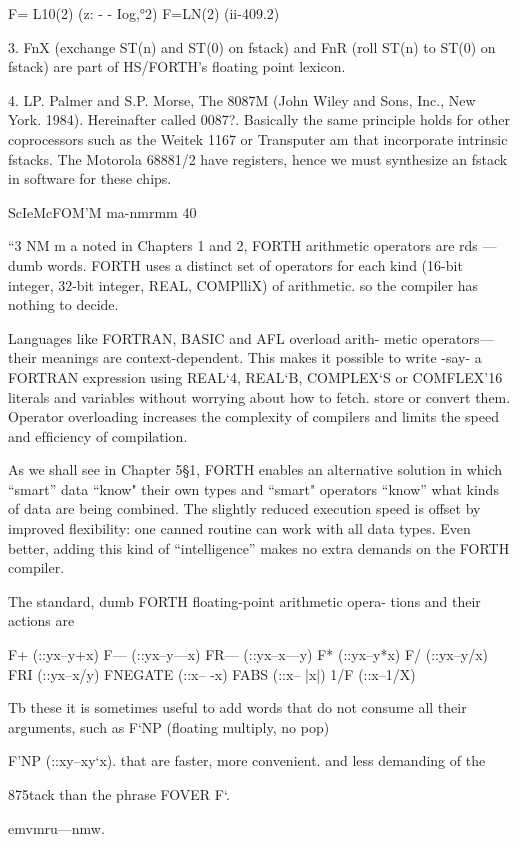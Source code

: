 F= L10(2) (z: - - Iog,°2)
F=LN(2) (ii-409.2)

 

3. FnX (exchange ST(n) and ST(0) on fstack) and FnR (roll ST(n) to ST(0) on fstack) are part of
HS/FORTH’s floating point lexicon.

4. LP. Palmer and S.P. Morse, The 8087M (John Wiley and Sons, Inc., New York. 1984).
Hereinafter called 0087?. Basically the same principle holds for other coprocessors such as
the Weitek 1167 or Transputer am that incorporate intrinsic fstacks. The Motorola 68881/2 have
registers, hence we must synthesize an fstack in software for these chips.

ScIeMcFOM'M ma-nmrmm 40

“3 NM m
a noted in Chapters 1 and 2, FORTH arithmetic operators are
rds —dumb words. FORTH uses a distinct set of operators
for each kind (16-bit integer, 32-bit integer, REAL, COMPlliX)
of arithmetic. so the compiler has nothing to decide.

Languages like FORTRAN, BASIC and AFL overload arith-
metic operators—their meanings are context-dependent. This
makes it possible to write -say- a FORTRAN expression using
REAL‘4, REAL‘B, COMPLEX‘S or COMFLEX’16 literals
and variables without worrying about how to fetch. store or
convert them. Operator overloading increases the complexity of
compilers and limits the speed and efﬁciency of compilation.

As we shall see in Chapter 5§1, FORTH enables an alternative
solution in which “smart” data “know" their own types and
“smart" operators “know” what kinds of data are being combined.
The slightly reduced execution speed is offset by improved
ﬂexibility: one canned routine can work with all data types. Even
better, adding this kind of “intelligence” makes no extra demands
on the FORTH compiler.

The standard, dumb FORTH floating-point arithmetic opera-
tions and their actions are

F+ (::yx--y+x)
F— (::yx--y—x)
FR— (::yx--x—y)
F* (::yx--y*x)
F/ (::yx--y/x)
FRI (::yx--x/y)
FNEGATE (::x-- -x)
FABS (::x-- |x|)
1/F (::x--1/X)

Tb these it is sometimes useful to add words that do not consume
all their arguments, such as F‘NP (floating multiply, no pop)

F'NP (::xy--xy‘x).
that are faster, more convenient. and less demanding of the

875tack than the phrase FOVER F‘.

emvmru—nmw.

